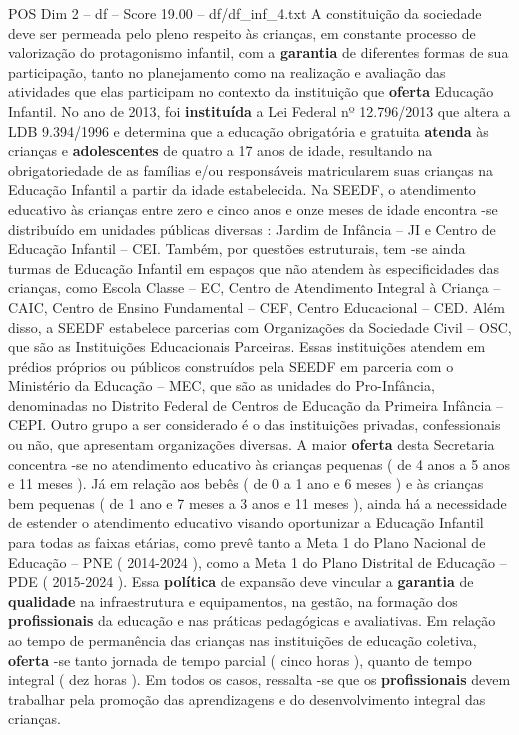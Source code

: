 \begin{textsample}{POS Dim 2 – df – Score 19.00 – df/df\_inf\_4.txt}
A constituição da sociedade deve ser permeada pelo pleno respeito às crianças, em constante processo de valorização do protagonismo infantil, com a \textbf{garantia} de diferentes formas de sua participação, tanto no planejamento como na realização e avaliação das atividades que elas participam no contexto da instituição que \textbf{oferta} Educação Infantil.
No ano de 2013, foi \textbf{instituída} a Lei Federal nº 12.796/2013 que altera a LDB 9.394/1996 e determina que a educação obrigatória e gratuita \textbf{atenda} às crianças e \textbf{adolescentes} de quatro a 17 anos de idade, resultando na obrigatoriedade de as famílias e/ou responsáveis matricularem suas crianças na Educação Infantil a partir da idade estabelecida.
Na SEEDF, o atendimento educativo às crianças entre zero e cinco anos e onze meses de idade encontra -se distribuído em unidades públicas diversas : Jardim de Infância – JI e Centro de Educação Infantil – CEI.
Também, por questões estruturais, tem -se ainda turmas de Educação Infantil em espaços que não atendem às especificidades das crianças, como Escola Classe – EC, Centro de Atendimento Integral à Criança – CAIC, Centro de Ensino Fundamental – CEF, Centro Educacional – CED.
Além disso, a SEEDF estabelece parcerias com Organizações da Sociedade Civil – OSC, que são as Instituições Educacionais Parceiras.
Essas instituições atendem em prédios próprios ou públicos construídos pela SEEDF em parceria com o Ministério da Educação – MEC, que são as unidades do Pro-Infância, denominadas no Distrito Federal de Centros de Educação da Primeira Infância – CEPI.
Outro grupo a ser considerado é o das instituições privadas, confessionais ou não, que apresentam organizações diversas.
A maior \textbf{oferta} desta Secretaria concentra -se no atendimento educativo às crianças pequenas ( de 4 anos a 5 anos e 11 meses ).
Já em relação aos bebês ( de 0 a 1 ano e 6 meses ) e às crianças bem pequenas ( de 1 ano e 7 meses a 3 anos e 11 meses ), ainda há a necessidade de estender o atendimento educativo visando oportunizar a Educação Infantil para todas as faixas etárias, como prevê tanto a Meta 1 do Plano Nacional de Educação – PNE ( 2014-2024 ), como a Meta 1 do Plano Distrital de Educação – PDE ( 2015-2024 ).
Essa \textbf{política} de expansão deve vincular a \textbf{garantia} de \textbf{qualidade} na infraestrutura e equipamentos, na gestão, na formação dos \textbf{profissionais} da educação e nas práticas pedagógicas e avaliativas.
Em relação ao tempo de permanência das crianças nas instituições de educação coletiva, \textbf{oferta} -se tanto jornada de tempo parcial ( cinco horas ), quanto de tempo integral ( dez horas ).
Em todos os casos, ressalta -se que os \textbf{profissionais} devem trabalhar pela promoção das aprendizagens e do desenvolvimento integral das crianças.

\end{textsample}
